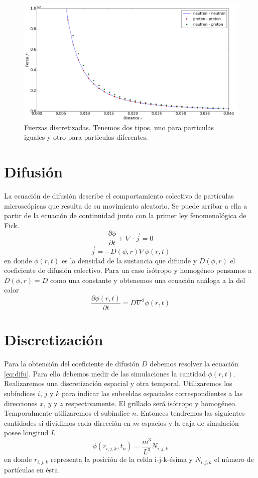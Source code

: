 \documentclass[
 reprint,
 amsmath,amssymb,
 aps,
 a4paper
]{revtex4-1}
\begin{document}
\begin{figure}[H]
\centerline{
  \includegraphics[width=1.0\linewidth]{forces.png}}
  \caption{\small Fuerzas discretizadas. Tenemos dos tipos, uno para particulas iguales y otro para particulas diferentes.}
  \label{fig:forcs}
\end{figure}

\section{\label{seq:difu}Difusión}
La ecuación de difusión describe el comportamiento colectivo de partículas microscópicas que resulta de su movimiento aleatorio. Se puede arribar a ella a partir de la ecuación de continuidad junto con la primer ley fenomenológica de Fick.
\begin{equation}\label{eq:cont}
\frac{\partial \phi}{\partial t} + \nabla \cdot \vec{j}  = 0
\end{equation}
\begin{equation}
\vec{j} = - D(\phi,r)\nabla \phi(r,t)
\end{equation}
en donde $\phi(r,t)$ es la densidad de la sustancia que difunde y $D(\phi,r)$ el coeficiente de difusión colectivo. Para un caso isótropo y homogéneo pensamos a $D(\phi,r) = D$ como una constante y obtenemos una ecuación análoga a la del calor
\begin{equation}\label{eq:difu}
\frac{\partial \phi(r,t)}{\partial t} = D \nabla^{2}\phi(r,t)
\end{equation}

\section{\label{seq:discre}Discretización}
Para la obtención del coeficiente de difusión $D$ debemos resolver la ecuación \ref{eq:difu}. Para ello debemos medir de las simulaciones la cantidad $\phi(r,t)$. Realizaremos una discretización espacial y otra temporal. Utilizaremos los subíndices $i$, $j$ y $k$ para indicar las subceldas espaciales correspondientes a las direcciones $x$, $y$ y $z$ respectivamente. El grillado será isótropo y homogéneo. Temporalmente utilizaremos el subíndice $n$. Entonces tendremos las siguientes cantidades si dividimos cada dirección en $m$ espacios y la caja de simulación posee longitud $L$
\begin{equation}
\phi(r_{i,j,k},t_{n}) = \frac{m^{3}}{L^{3}}N_{i,j,k} 
\end{equation}
en donde $r_{i,j,k}$ representa la posición de la celda i-j-k-ésima y $N_{i,j,k}$ el número de partículas en ésta.
\end{document}
